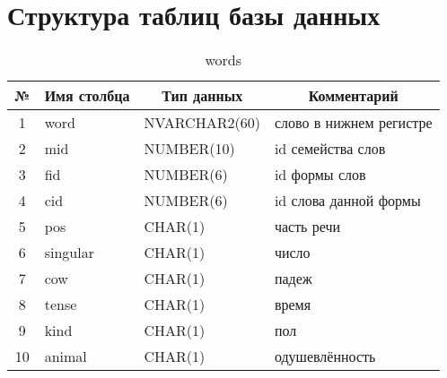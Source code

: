 \documentclass[main]{subfiles}
\begin{document}
\section{Структура таблиц базы данных}\label{app:A}

\begin{table}[!h]
	\begin{center}
		\captionsetup{format=hang,labelsep = endash, singlelinecheck=false}
		\caption{words}
		\begin{tabular}{|c|l|l|l|}
			\hline
			\textbf{№} & \multicolumn{1}{c|}{\textbf{Имя столбца}} & \multicolumn{1}{c|}{\textbf{Тип данных}} & \multicolumn{1}{c|}{\textbf{Комментарий}} \\ \hline
			1& word &NVARCHAR2(60) & слово в нижнем регистре\\ \hline
			2&mid& NUMBER(10) & id семейства слов  \\ \hline
			3&fid&NUMBER(6)& id формы слов\\ \hline
			4&cid&NUMBER(6)& id слова данной формы\\ \hline
			5&pos&CHAR(1)& часть речи\\ \hline
			6&singular&CHAR(1)& число \\ \hline
			7&cow &CHAR(1)&падеж \\ \hline
			8&tense &  CHAR(1)& время\\ \hline
			9&kind& CHAR(1)& пол\\ \hline
			10&animal&CHAR(1)&одушевлённость \\ \hline
		\end{tabular}
	\end{center}
\end{table}
\end{document}
